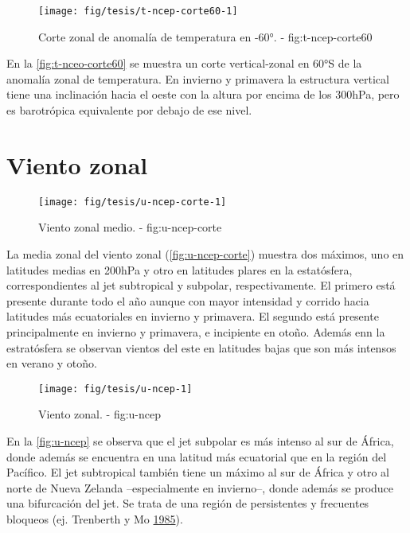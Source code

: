 \documentclass[spanish,a4paper,12p]{book}
\begin{document}
\begin{figure}

{\centering \texttt{[image: fig/tesis/t-ncep-corte60-1]} 

}

\caption{Corte zonal de anomalía de temperatura en -60°. - fig:t-ncep-corte60}\label{fig:t-ncep-corte60}
\end{figure}

En la \autoref{fig:t-nceo-corte60} se muestra un corte vertical-zonal en
60°S de la anomalía zonal de temperatura. En invierno y primavera la
estructura vertical tiene una inclinación hacia el oeste con la altura
por encima de los 300hPa, pero es barotrópica equivalente por debajo de
ese nivel.

\section{Viento zonal}\label{viento-zonal}

\begin{figure}

{\centering \texttt{[image: fig/tesis/u-ncep-corte-1]} 

}

\caption{Viento zonal medio. - fig:u-ncep-corte}\label{fig:u-ncep-corte}
\end{figure}

La media zonal del viento zonal (\autoref{fig:u-ncep-corte}) muestra dos
máximos, uno en latitudes medias en 200hPa y otro en latitudes plares en
la estatósfera, correspondientes al jet subtropical y subpolar,
respectivamente. El primero está presente durante todo el año aunque con
mayor intensidad y corrido hacia latitudes más ecuatoriales en invierno
y primavera. El segundo está presente principalmente en invierno y
primavera, e incipiente en otoño. Además enn la estratósfera se observan
vientos del este en latitudes bajas que son más intensos en verano y
otoño.

\begin{landscape}\begin{figure}

{\centering \texttt{[image: fig/tesis/u-ncep-1]} 

}

\caption{Viento zonal. - fig:u-ncep}\label{fig:u-ncep}
\end{figure}
\end{landscape}

En la \autoref{fig:u-ncep} se observa que el jet subpolar es más intenso
al sur de África, donde además se encuentra en una latitud más
ecuatorial que en la región del Pacífico. El jet subtropical también
tiene un máximo al sur de África y otro al norte de Nueva Zelanda
--especialmente en invierno--, donde además se produce una bifurcación
del jet. Se trata de una región de persistentes y frecuentes bloqueos
(ej. Trenberth y Mo \protect\hyperlink{ref-Trenberth1985}{1985}).
\end{document}
